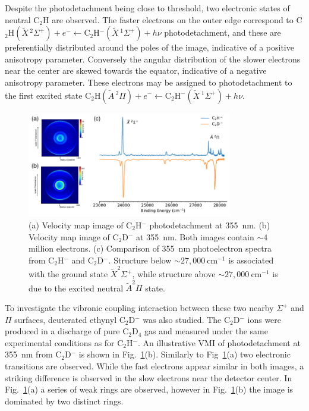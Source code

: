 \documentclass[journal=jpcafh,manuscript=article,layout=onecolumn, 12pt]{achemso}
\begin{document}
Despite the photodetachment being close to threshold, two electronic states of neutral C$_2$H are observed. The faster electrons on the outer edge correspond to C$_2$H$(\tilde{X}\,^2\Sigma^+)+e^- \leftarrow $C$_2$H$^-(\tilde{X}\,^1\Sigma^+)+h\nu$ photodetachment, and these are preferentially distributed around the poles of the image, indicative of a positive anisotropy parameter. Conversely the angular distribution of the slower electrons near the center are skewed towards the equator, indicative of a negative anisotropy parameter. These electrons may be assigned to photodetachment to the first excited state C$_2$H$(\tilde{A}\,^2\Pi)+e^- \leftarrow $C$_2$H$^-(\tilde{X}\,^1\Sigma^+)+h\nu$.

\begin{figure}
	\includegraphics[width=0.8\textwidth]{figures/Fig1}
	\caption{(a) Velocity map image of C$_2$H$^-$ photodetachment at 355~nm. (b) Velocity map image of C$_2$D$^-$ at 355~nm. Both images contain $\sim4$ million electrons. (c) Comparison of 355~nm photoelectron spectra from C$_2$H$^-$ and C$_2$D$^-$. Structure below $\sim 27,000~$cm$^{-1}$ is associated with the ground state $\tilde{X} ^2\Sigma^+$, while structure above  $\sim 27,000~$cm$^{-1}$ is due to the excited neutral $\tilde{A} ^2\Pi$ state.}
	\label{fig:1}
\end{figure}

To investigate the vibronic coupling interaction between these two nearby $\Sigma^+$ and $\Pi$ surfaces, deuterated ethynyl C$_2$D$^-$ was also studied. The C$_2$D$^-$ ions were produced in a discharge of pure C$_2$D$_4$ gas and measured under the same experimental conditions as for C$_2$H$^-$. An illustrative VMI of photodetachment at 355~nm from C$_2$D$^-$ is shown in Fig.~\ref{fig:1}(b). Similarly to Fig~\ref{fig:1}(a) two electronic transitions are observed. While the fast electrons appear similar in both images, a striking difference is observed in the slow electrons near the detector center. In Fig.~\ref{fig:1}(a) a series of weak rings are observed, however in Fig.~\ref{fig:1}(b) the image is dominated by two distinct rings.
\end{document}
